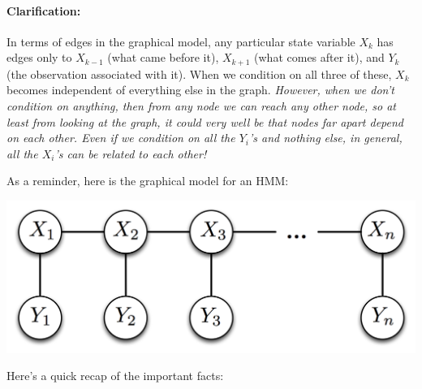 \documentclass[6008notes.tex]{subfiles}
\begin{document}
\paragraph{Clarification:} In terms of edges in the graphical model, any particular state variable $X_k$ has edges only to $X_{k-1}$ (what came before it), $X_{k+1}$ (what comes after it), and $Y_k$ (the observation associated with it). When we condition on all three of these, $X_k$ becomes independent of everything else in the graph. \textit{However, when we don't condition on anything, then from any node we can reach any other node, so at least from looking at the graph, it could very well be that nodes far apart depend on each other. Even if we condition on all the $Y_i$'s and nothing else, in general, all the $X_i$'s can be related to each other!}

As a reminder, here is the graphical model for an HMM:

{\centering\includegraphics[scale=0.4]{images_sec-graphical-models-hmm} \par}

Here's a quick recap of the important facts:
\end{document}
